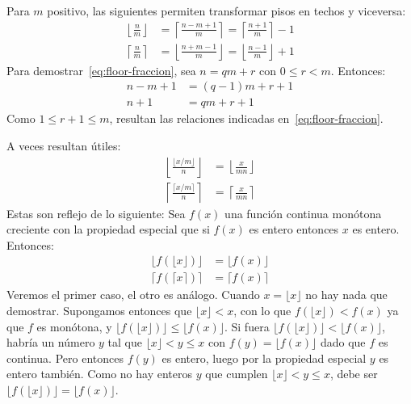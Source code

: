   Para \(m\) positivo,
  las siguientes permiten transformar pisos en techos y viceversa:
  \begin{align}
    \label{eq:floor-fraccion}
    \left\lfloor \frac{n}{m} \right\rfloor
      &= \left\lceil \frac{n - m + 1}{m} \right\rceil
       = \left\lceil \frac{n + 1}{m} \right\rceil - 1 \\
    \label{eq:ceil-fraccion}
    \left\lceil \frac{n}{m} \right\rceil
      &= \left\lfloor \frac{n + m - 1}{m} \right\rfloor
       = \left\lfloor \frac{n - 1}{m} \right\rfloor + 1
  \end{align}
  Para demostrar~\eqref{eq:floor-fraccion},
  sea \(n = q m + r\) con \(0 \le r < m\).
  Entonces:
  \begin{align*}
    n - m + 1
      &= (q - 1) m + r + 1 \\
    n + 1
      &= q m + r + 1
  \end{align*}
  Como \(1 \le r + 1 \le m\),
  resultan las relaciones indicadas en~\eqref{eq:floor-fraccion}.

  A veces resultan útiles:
  \begin{align}
    \label{eq:frac-floor-floor}
    \left\lfloor \frac{\lfloor x / m \rfloor}{n} \right\rfloor
      &= \left\lfloor \frac{x}{m n} \right\rfloor \\
    \label{eq:frac-ceil-ceil}
    \left\lceil \frac{\lceil x / m \rceil}{n} \right\rceil
      &= \left\lceil \frac{x}{m n} \right\rceil
  \end{align}
  Estas son reflejo de lo siguiente:
  Sea \(f(x)\) una función continua monótona creciente
  con la propiedad especial
  que si \(f(x)\) es entero entonces \(x\) es entero.
  Entonces:
  \begin{align*}
    \lfloor f(\lfloor x \rfloor)\rfloor
      &= \lfloor f(x) \rfloor \\
    \lceil f(\lceil x \rceil)\rceil
      &= \lceil f(x) \rceil
  \end{align*}
  Veremos el primer caso,
  el otro es análogo.
  Cuando \(x = \lfloor x \rfloor\) no hay nada que demostrar.
  Supongamos entonces que \(\lfloor x \rfloor < x\),
  con lo que \(f(\lfloor x \rfloor) < f(x)\)
  ya que \(f\) es monótona,
  y \(\lfloor f(\lfloor x \rfloor) \rfloor
	\le \lfloor f(x) \rfloor\).
  Si fuera \(\lfloor f(\lfloor x \rfloor) \rfloor
	       < \lfloor f(x) \rfloor\),
  habría un número \(y\) tal que \(\lfloor x \rfloor < y \le x\)
  con \(f(y) = \lfloor f(x) \rfloor\) dado que \(f\) es continua.
  Pero entonces \(f(y)\) es entero,
  luego por la propiedad especial \(y\) es entero también.
  Como no hay enteros \(y\)
  que cumplen \(\lfloor x \rfloor < y \le x\),
  debe ser
    \(\lfloor f(\lfloor x \rfloor) \rfloor
	= \lfloor f(x) \rfloor\).


